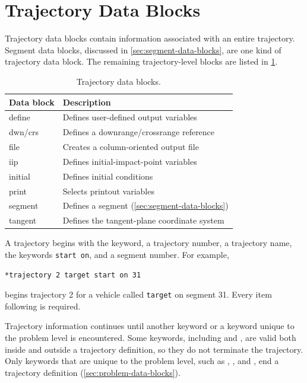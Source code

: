 \section{Trajectory Data Blocks}\label{sec:trajectory-data-blocks}

Trajectory data blocks contain information associated with an entire trajectory.
Segment data blocks, discussed in \cref{sec:segment-data-blocks}, are one kind of
trajectory data block. The remaining trajectory-level blocks are listed in
\cref{tab:trajectory-data-blocks}.

\begin{table}[htbp]
  \centering
  \caption{Trajectory data blocks.}
  \label{tab:trajectory-data-blocks}
  \begin{tabularx}{0.82\linewidth}{@{}>{\ttfamily}lX@{}}
    \toprule
    \normalfont Data block & Description \\
    \midrule
    *define   & Defines user-defined output variables \\
    *dwn/crs  & Defines a downrange/crossrange reference \\
    *file     & Creates a column-oriented output file \\
    *iip      & Defines initial-impact-point variables \\
    *initial  & Defines initial conditions \\
    *print    & Selects printout variables \\
    *segment  & Defines a segment (\cref{sec:segment-data-blocks}) \\
    *tangent  & Defines the tangent-plane coordinate system \\
    \bottomrule
  \end{tabularx}
\end{table}

A trajectory begins with the  keyword, a trajectory
number, a trajectory name, the keywords \texttt{start on}, and a segment number.
For example,

\begin{lstlisting}[style=taosmanual]
*trajectory 2 target start on 31
\end{lstlisting}

begins trajectory 2 for a vehicle called \texttt{target} on segment 31. Every item
following  is required.

Trajectory information continues until another  keyword
or a keyword unique to the problem level is encountered. Some keywords, including
 and , are valid both inside and outside a
trajectory definition, so they do not terminate the trajectory. Only keywords that
are unique to the problem level, such as ,
, and , end a trajectory definition
(\cref{sec:problem-data-blocks}).

